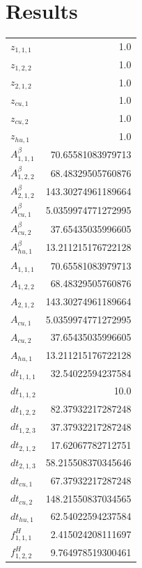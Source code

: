 \documentclass{article}%
\makeatletter
\let\mcnewpage=\newpage%
\newcommand{\TrickSupertabularIntoMulticols}{%
\renewcommand\newpage{%
\if@firstcolumn%
\hrule width\linewidth height0pt%
\columnbreak%
\else%
\mcnewpage%
\fi%
}%
}%
\makeatother
\begin{document}
\section{Results}%
\thispagestyle{plain}%
\begin{multicols*}{3}%
\TrickSupertabularIntoMulticols%
%
\begin{supertabular}{lr}%
	$z_{1,1,1}$ & 1.0 \\%
	$z_{1,2,2}$ & 1.0 \\%
	$z_{2,1,2}$ & 1.0 \\%
	$z_{cu,1}$ & 1.0 \\%
	$z_{cu,2}$ & 1.0 \\%
	$z_{hu,1}$ & 1.0 \\%
	$A_{1,1,1}^{\beta}$ & 70.65581083979713 \\%
	$A_{1,2,2}^{\beta}$ & 68.48329505760876 \\%
	$A_{2,1,2}^{\beta}$ & 143.30274961189664 \\%
	$A_{cu,1}^{\beta}$ & 5.0359974771272995 \\%
	$A_{cu,2}^{\beta}$ & 37.65435035996605 \\%
	$A_{hu,1}^{\beta}$ & 13.211215176722128 \\%
	$A_{1,1,1}$ & 70.65581083979713 \\%
	$A_{1,2,2}$ & 68.48329505760876 \\%
	$A_{2,1,2}$ & 143.30274961189664 \\%
	$A_{cu,1}$ & 5.0359974771272995 \\%
	$A_{cu,2}$ & 37.65435035996605 \\%
	$A_{hu,1}$ & 13.211215176722128 \\%
	$dt_{1,1,1}$ & 32.54022594237584 \\%
	$dt_{1,1,2}$ & 10.0 \\%
	$dt_{1,2,2}$ & 82.37932217287248 \\%
	$dt_{1,2,3}$ & 37.37932217287248 \\%
	$dt_{2,1,2}$ & 17.62067782712751 \\%
	$dt_{2,1,3}$ & 58.215508370345646 \\%
	$dt_{cu,1}$ & 67.37932217287248 \\%
	$dt_{cu,2}$ & 148.21550837034565 \\%
	$dt_{hu,1}$ & 62.54022594237584 \\%
	$f_{1,1,1}^{H}$ & 2.415024208111697 \\%
	$f_{1,2,2}^{H}$ & 9.764978519300461 \\%

\end{supertabular}
\end{multicols*}
\end{document}
